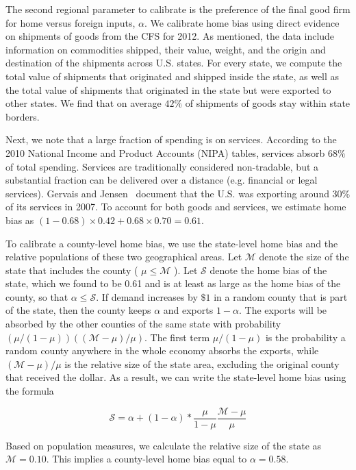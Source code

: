\documentclass[\latexroot/\projectname]{subfiles}
\begin{document}
The second regional parameter to calibrate is the preference of the final good firm for home versus foreign inputs, $\alpha$. We calibrate home bias using direct evidence on shipments of goods from the CFS for 2012. As mentioned, the data include information on commodities shipped, their value, weight, and the origin and destination of the shipments across U.S. states. For every state, we compute the total value of shipments that originated and shipped inside the state, as well as the total value of shipments that originated in the state but were exported to other states. We find that on average $42 \%$ of shipments of goods stay within state borders.

Next, we note that a large fraction of spending is on services. According to the 2010 National Income and Product Accounts (NIPA) tables, services absorb $68 \%$ of total spending. Services are traditionally considered non-tradable, but a substantial fraction can be delivered over a distance (e.g. financial or legal services). Gervais and Jensen~\cite{Gervais2019-np} document that the U.S. was exporting around $30 \%$ of its services in 2007. To account for both goods and services, we estimate home bias as $(1-0.68) \times 0.42+ 0.68 \times 0.70=0.61$.

To calibrate a county-level home bias, we use the state-level home bias and the relative populations of these two geographical areas. Let $\mathcal{M}$ denote the size of the state that includes the county ( $\mu \leq \mathcal{M}$ ). Let $\mathcal{S}$ denote the home bias of the state, which we found to be 0.61 and is at least as large as the home bias of the county, so that $\alpha \leq \mathcal{S}$. If demand increases by $\$ 1$ in a random county that is part of the state, then the county keeps $\alpha$ and exports $1-\alpha$. The exports will be absorbed by the other counties of the same state with probability $(\mu /(1-\mu))((\mathcal{M}-\mu) / \mu)$. The first term $\mu /(1-\mu)$ is the probability a random county anywhere in the whole economy absorbs the exports, while $(\mathcal{M}-\mu) / \mu$ is the relative size of the state area, excluding the original county that received the dollar. As a result, we can write the state-level home bias using the formula

$$
\mathcal{S}=\alpha+(1-\alpha) * \frac{\mu}{1-\mu} \frac{\mathcal{M}-\mu}{\mu}
$$

Based on population measures, we calculate the relative size of the state as $\mathcal{M}=0.10$. This implies a county-level home bias equal to $\alpha=0.58$.
\end{document}
